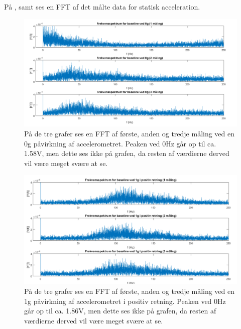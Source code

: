 På ,  samt  ses en FFT af det målte data for statisk acceleration.
\begin{figure}[H]
	\centering
	\includegraphics[scale=0.5]{figures/cProblemloesning/Pilotforsoeg_Frekvens0.png}
	\caption{På de tre grafer ses en FFT af første, anden og tredje måling ved en 0g påvirkning af accelerometret. Peaken ved 0Hz går op til ca. 1.58V, men dette ses ikke på grafen, da resten af værdierne derved vil være meget svære at se.}
	\label{Fig:Pilot_FFT0}
\end{figure}
\begin{figure}[H]
	\centering
	\includegraphics[scale=0.5]{figures/cProblemloesning/Pilotforsoeg_FrekvensP.png}
	\caption{På de tre grafer ses en FFT af første, anden og tredje måling ved en 1g påvirkning af accelerometret i positiv retning. Peaken ved 0Hz går op til ca. 1.86V, men dette ses ikke på grafen, da resten af værdierne derved vil være meget svære at se.}
	\label{Fig:Pilot_FFTP}
\end{figure}
